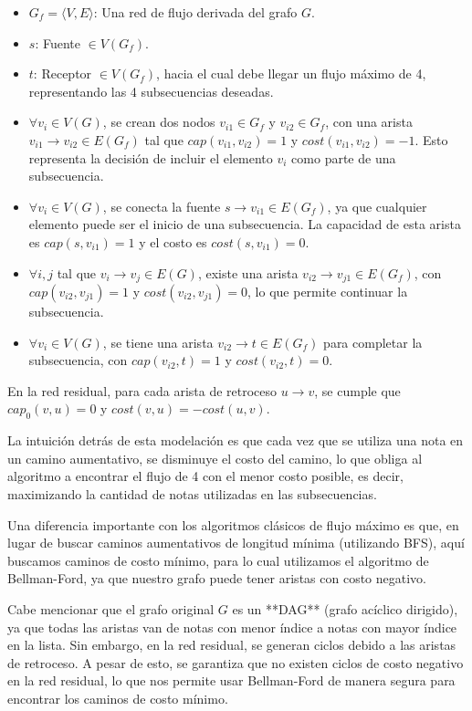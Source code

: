 \documentclass{article}
\begin{document}
\begin{itemize}
    \item $G_f = \langle V, E \rangle$: Una red de flujo derivada del grafo $G$.
    \item $s$: Fuente $\in V(G_f)$.
    \item $t$: Receptor $\in V(G_f)$, hacia el cual debe llegar un flujo máximo de 4, representando las 4 subsecuencias deseadas.
    \item $\forall v_i \in V(G)$, se crean dos nodos $v_{i1} \in G_f$ y $v_{i2} \in G_f$, con una arista $v_{i1} \rightarrow v_{i2} \in E(G_f)$ tal que $cap(v_{i1},v_{i2}) = 1$ y $cost(v_{i1},v_{i2}) = -1$. Esto representa la decisión de incluir el elemento $v_i$ como parte de una subsecuencia.
    \item $\forall v_i \in V(G)$, se conecta la fuente $s \rightarrow v_{i1} \in E(G_f)$, ya que cualquier elemento puede ser el inicio de una subsecuencia. La capacidad de esta arista es $cap(s,v_{i1}) = 1$ y el costo es $cost(s,v_{i1}) = 0$.
    \item $\forall i,j$ tal que $v_i \rightarrow v_j \in E(G)$, existe una arista $v_{i2} \rightarrow v_{j1} \in E(G_f)$, con $cap(v_{i2},v_{j1}) = 1$ y $cost(v_{i2},v_{j1}) = 0$, lo que permite continuar la subsecuencia.
    \item $\forall v_i \in V(G)$, se tiene una arista $v_{i2} \rightarrow t \in E(G_f)$ para completar la subsecuencia, con $cap(v_{i2},t) = 1$ y $cost(v_{i2},t) = 0$.
\end{itemize}

En la red residual, para cada arista de retroceso $u \rightarrow v$, se cumple que $cap_0(v,u) = 0$ y $cost(v,u) = -cost(u,v)$.

La intuición detrás de esta modelación es que cada vez que se utiliza una nota en un camino aumentativo, se disminuye el costo del camino, lo que obliga al algoritmo a encontrar el flujo de 4 con el menor costo posible, es decir, maximizando la cantidad de notas utilizadas en las subsecuencias.

Una diferencia importante con los algoritmos clásicos de flujo máximo es que, en lugar de buscar caminos aumentativos de longitud mínima (utilizando BFS), aquí buscamos caminos de costo mínimo, para lo cual utilizamos el algoritmo de Bellman-Ford, ya que nuestro grafo puede tener aristas con costo negativo.

Cabe mencionar que el grafo original $G$ es un **DAG** (grafo acíclico dirigido), ya que todas las aristas van de notas con menor índice a notas con mayor índice en la lista. Sin embargo, en la red residual, se generan ciclos debido a las aristas de retroceso. A pesar de esto, se garantiza que no existen ciclos de costo negativo en la red residual, lo que nos permite usar Bellman-Ford de manera segura para encontrar los caminos de costo mínimo.
\end{document}
